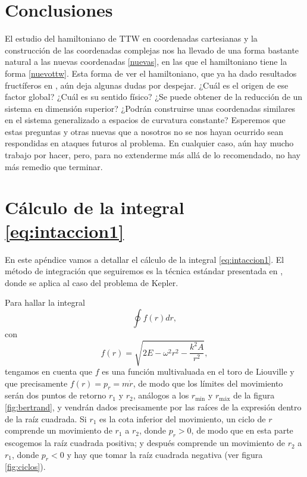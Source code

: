 \documentclass[11pt,a4paper,twoside]{article}
\theoremstyle{definition} \newtheorem{defn}[thm]{Definición}
\theoremstyle{definition} \newtheorem{ejemplo}[thm]{Ejemplo}
\theoremstyle{definition} \newtheorem{ejercicio}[thm]{Ejercicio}
\theoremstyle{remark} \newtheorem*{obs}{Observación}
\begin{document}
\section*{Conclusiones}
El estudio del hamiltoniano de TTW en coordenadas cartesianas y la construcción de las coordenadas complejas nos ha llevado de una forma bastante natural a las nuevas coordenadas \eqref{nuevas}, en las que el hamiltoniano tiene la forma \eqref{nuevottw}. Esta forma de ver el hamiltoniano, que ya ha dado resultados fructíferos en \cite{gubbiottilatini}, aún deja algunas dudas por despejar. ¿Cuál es el origen de ese factor global? ¿Cuál es su sentido físico? ¿Se puede obtener de la reducción de un sistema en dimensión superior? ¿Podrán construirse unas coordenadas similares en el sistema generalizado a espacios de curvatura constante? Esperemos que estas preguntas y otras nuevas que a nosotros no se nos hayan ocurrido sean respondidas en ataques futuros al problema. En cualquier caso, aún hay mucho trabajo por hacer, pero, para no extenderme más allá de lo recomendado, no hay más remedio que terminar. 

\appendix
\section{Cálculo de la integral \eqref{eq:intaccion1}}\label{apendice}
En este apéndice vamos a detallar el cálculo de la integral \eqref{eq:intaccion1}. El método de integración que seguiremos es la técnica estándar presentada en \cite{goldstein}, donde se aplica al caso del problema de Kepler.

Para hallar la integral
\begin{equation*}
  \oint f(r)dr, 
\end{equation*}
con
\begin{equation}
f(r)=\sqrt{2E-\omega^2r^2-\frac{k^2A}{r^2}},
\end{equation}
tengamos en cuenta que $f$ es una función multivaluada en el toro de Liouville y que precisamente $f(r)=p_r=m\dot{r}$, de modo que los límites del movimiento serán dos puntos de retorno $r_1$ y $r_2$, análogos a los $r_{\text{min}}$ y $r_{\text{máx}}$ de la figura \ref{fig:bertrand}, y vendrán dados precisamente por las raíces de la expresión dentro de la raíz cuadrada. Si $r_1$ es la cota inferior del movimiento, un ciclo de $r$ comprende un movimiento de $r_1$ a $r_2$, donde $p_r>0$, de modo que en esta parte escogemos la raíz cuadrada positiva; y después comprende un movimiento de $r_2$ a $r_1$, donde $p_r<0$ y hay que tomar la raíz cuadrada negativa (ver figura \ref{fig:ciclos}). 
\end{document}

